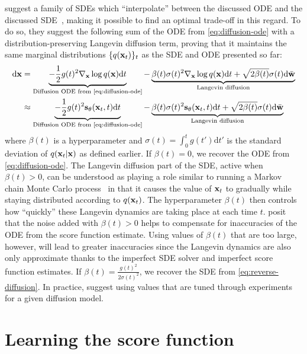 \citet{karras2022elucidating} suggest a family of SDEs which ``interpolate'' between the discussed ODE and the discussed SDE~\citep{karras2022elucidating}, making it possible to find an optimal trade-off in this regard. To do so, they suggest the following sum of the ODE from \cref{eq:diffusion-ode} with a distribution-preserving Langevin diffusion term, proving that it maintains the same marginal distributions $\{q({\mathbf{x}}_t)\}_t$ as the SDE and ODE presented so far:
\begin{align}
    \mathrm{d}\rvx &= \underbrace{- \frac{1}{2} g(t)^2 \nabla_\rvx \log q(\rvx) \mathrm{d}t}_\text{Diffusion ODE from \cref{eq:diffusion-ode}} - \underbrace{\beta(t) \sigma(t)^2 \nabla_\rvx \log q(\rvx) \mathrm{d}t + \sqrt{2\beta(t)}\sigma(t)\mathrm{d}\bar{\rvw}}_\text{Langevin diffusion}  \label{eq:diffusion-edm-sde-exact} \\
    &\approx \underbrace{- \frac{1}{2} g(t)^2 \rvs_\theta(\rvx_t, t) \mathrm{d}t}_\text{Diffusion ODE from \cref{eq:diffusion-ode}} - \underbrace{\beta(t) \sigma(t)^2 \rvs_\theta(\rvx_t, t) \mathrm{d}t + \sqrt{2\beta(t)}\sigma(t)\mathrm{d}\bar{\rvw}}_\text{Langevin diffusion} \label{eq:diffusion-edm-sde-approx}
\end{align}
where $\beta(t)$ is a hyperparameter and $\sigma(t) = \int_0^t g(t') \mathrm{d}t'$ is the standard deviation of $q({\mathbf{x}}_t|{\mathbf{x}})$ as defined earlier. 
If $\beta(t) = 0$, we recover the ODE from \cref{eq:diffusion-ode}. The Langevin diffusion part of the SDE, active when $\beta(t) > 0$, can be understood as playing a role similar to running a Markov chain Monte Carlo process~\citep{bishop2006pattern} in that it causes the value of ${\mathbf{x}}_t$ to gradually while staying distributed according to $q({\mathbf{x}}_t)$. The hyperparameter $\beta(t)$ then controls how ``quickly'' these Langevin dynamics are taking place at each time $t$. \citet{karras2022elucidating} posit that the noise added with $\beta(t) > 0$ helps to compensate for inaccuracies of the ODE from the score function estimate. Using values of $\beta(t)$ that are too large, however, will lead to greater inaccuracies since the Langevin dynamics are also only approximate thanks to the imperfect SDE solver and imperfect score function estimates. If $\beta(t) = \frac{g(t)^2}{2 \sigma(t)^2}$, we recover the SDE from \cref{eq:reverse-diffusion}. In practice, \citet{karras2022elucidating} suggest using values that are tuned through experiments for a given diffusion model.


\section{Learning the score function} \label{sec:diffusion-training}

